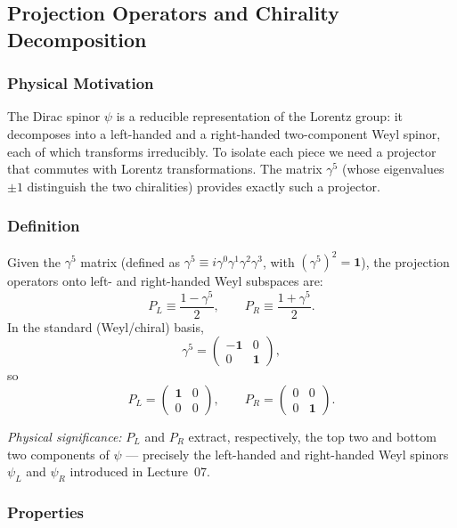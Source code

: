 \documentclass[../main.tex]{subfiles}
\begin{document}
\subsection*{Projection Operators and Chirality Decomposition}

\subsubsection*{Physical Motivation}

The Dirac spinor $\psi$ is a reducible representation of the Lorentz group: it decomposes into a left-handed and a right-handed two-component Weyl spinor, each of which transforms irreducibly.  To isolate each piece we need a projector that commutes with Lorentz transformations.  The matrix $\gamma^5$ (whose eigenvalues $\pm1$ distinguish the two chiralities) provides exactly such a projector.

\subsubsection*{Definition}

Given the $\gamma^5$ matrix (defined as $\gamma^5 \equiv i\gamma^0\gamma^1\gamma^2\gamma^3$, with $(\gamma^5)^2 = \mathbf{1}$), the projection operators onto left- and right-handed Weyl subspaces are:
\begin{equation}
  \boxed{P_L \equiv \frac{1-\gamma^5}{2}, \qquad P_R \equiv \frac{1+\gamma^5}{2}.}
  \label{eq:lec08:projectors}
\end{equation}
In the standard (Weyl/chiral) basis,
\[
  \gamma^5 = \begin{pmatrix}-\mathbf{1}&0\\0&\mathbf{1}\end{pmatrix},
\]
so
\[
  P_L = \begin{pmatrix}\mathbf{1}&0\\0&0\end{pmatrix}, \qquad
  P_R = \begin{pmatrix}0&0\\0&\mathbf{1}\end{pmatrix}.
\]

\textit{Physical significance:} $P_L$ and $P_R$ extract, respectively, the top two and bottom two components of $\psi$ — precisely the left-handed and right-handed Weyl spinors $\psi_L$ and $\psi_R$ introduced in Lecture~07.

\subsubsection*{Properties}
\end{document}
